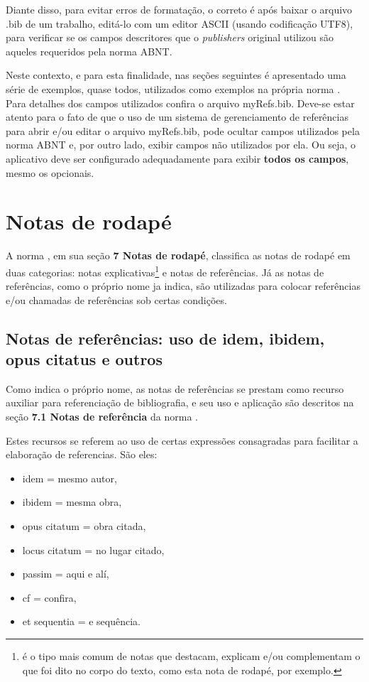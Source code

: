\begin{apendicesenv}
Diante disso, para evitar erros de formatação, o correto é após baixar o arquivo {\ttfamily .bib} de um trabalho, editá-lo com um editor ASCII (usando codificação UTF8), para verificar se os campos descritores que o \textit{publishers} original utilizou são aqueles requeridos pela norma ABNT.

Neste contexto, e para esta finalidade, nas seções seguintes é apresentado uma série de exemplos, quase todos, utilizados como exemplos na própria norma . Para detalhes dos campos utilizados confira o arquivo {\ttfamily myRefs.bib}. Deve-se estar atento para o fato de que o uso de um sistema de gerenciamento de referências para abrir e/ou editar o arquivo {\ttfamily myRefs.bib}, pode ocultar campos utilizados pela norma ABNT e, por outro lado, exibir campos não utilizados por ela. Ou seja, o aplicativo deve ser configurado adequadamente para exibir \textbf{todos os campos}, mesmo os opcionais.

\section{Notas de rodapé}
\label{sec:notasRodape}

A norma , em sua seção \textbf{7 Notas de rodapé}, classifica as notas de rodapé em duas categorias: notas explicativas\footnote{é o tipo mais comum de notas que destacam, explicam e/ou complementam o que foi dito no corpo do texto, como esta nota de rodapé, por exemplo.} e notas de referências. Já as notas de referências, como o próprio nome ja indica, são utilizadas para colocar referências e/ou chamadas de referências sob certas condições.

\subsection{Notas de referências: uso de idem, ibidem, opus citatus e outros}
\label{subsec:notasRefs}

Como indica o próprio nome, as notas de referências se prestam como recurso auxiliar para referenciação de bibliografia, e seu uso e aplicação são descritos na seção \textbf{7.1 Notas de referência} da norma .

Estes recursos se referem ao uso de certas expressões consagradas para facilitar a elaboração de referencias. São eles:

\begin{itemize}
    \item idem = mesmo autor,
    \item ibidem = mesma obra,
    \item opus citatum = obra citada,
    \item locus citatum = no lugar citado,
    \item passim = aqui e alí,
    \item cf = confira,
    \item et sequentia = e sequência.
\end{itemize}


\end{apendicesenv}
